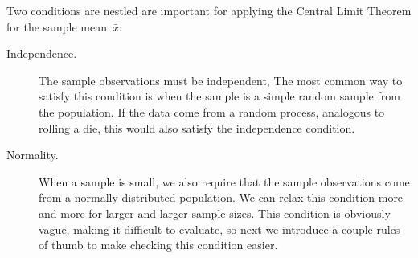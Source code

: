 \noindent%
Two conditions are nestled are important for
applying the
Central Limit Theorem
for the sample mean~$\bar{x}$:
\begin{description}
\item[Independence.]
    The sample observations must be independent,
    The most common way to satisfy this condition is
    when the sample is a simple random sample from the
    population.
    If the data come from a random process,
    analogous to rolling a die,
    this would also satisfy the independence condition.
\item[Normality.]
    When a sample is small,
    we also require that the sample observations
    come from a normally distributed population.
    We can relax this condition more and more
    for larger and larger sample sizes.
    This condition is obviously vague,
    making it difficult to evaluate,
    so next we introduce a couple rules of thumb
    to make checking this condition easier.
\end{description}
%
%
%
%

